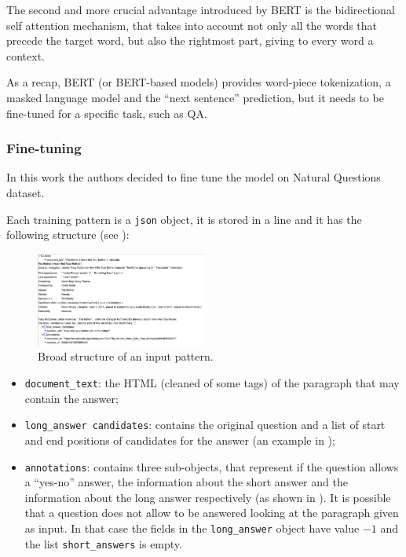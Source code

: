 \documentclass[10pt,hidelinks]{article}
\begin{document}
The second and more crucial advantage introduced by BERT is the bidirectional self attention mechanism, that takes into account not only all the words that precede the target word, but also the rightmost part, giving to every word a context.





As a recap, BERT (or BERT-based models) provides word-piece tokenization, a masked language model and  the ``next sentence'' prediction, but it needs to be fine-tuned for a specific task, such as QA.

\subsubsection{Fine-tuning}\label{subsubsec:finetuning}
In this work the authors decided to fine tune the model on Natural Questions dataset.

Each training pattern is a \texttt{json} object, it is stored in a line and it has the following structure (see ):

\begin{figure}[ht!]
	\centering
	\includegraphics[width=0.5\textwidth]{pics/json.png}
	\caption{Broad structure of an input pattern.}\label{fig:json}
\end{figure}

\begin{itemize}
	\item {\tt document\_text}: the HTML (cleaned of some tags) of the paragraph that may contain the answer;
	\item {\tt long\_answer candidates}: contains the original question and a list of start and end positions of candidates for the answer (an example in );
	\item {\tt annotations}: contains three sub-objects, that represent if the question allows a ``yes-no'' answer, the information about the short answer and the information about the long answer respectively (as shown in ). It is possible that a question does not allow to be answered looking at the paragraph given as input. In that case the fields in the \texttt{long\_answer} object have value $-1$ and the list \texttt{short\_answers} is empty.
\end{itemize}
\end{document}
